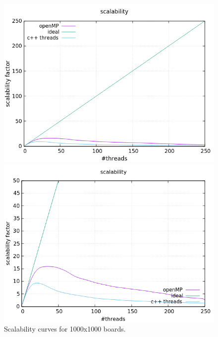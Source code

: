 \documentclass[a4paper,10pt]{article}
\begin{document}
	\begin{figure}[H]
		\centering
		\begin{minipage}[t]{0.55\linewidth}
			\includegraphics[width=\linewidth]{BenchMarkGOL/scalability/1000/graph1000_scal.png}
		\end{minipage}%
		\begin{minipage}[t]{0.55\linewidth}
			\includegraphics[width=\linewidth]{BenchMarkGOL/scalability/1000/graph1000_scal_zoom.png}
		\end{minipage}
		\caption{Scalability curves for 1000x1000 boards.}
		\label{1000s}
	\end{figure}
\end{document}

